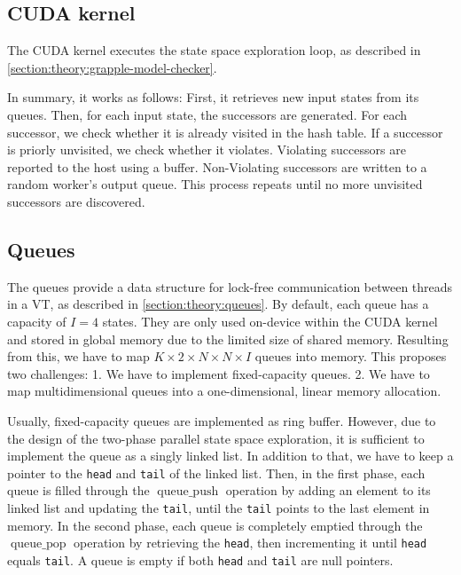 \documentclass[
fancyheadings, %
%
%
]{stsreprt}
\DeclareMathOperator{\qPop}{queue\_pop}
\DeclareMathOperator{\qPush}{queue\_push}
\begin{document}
\subsection{CUDA kernel}

The CUDA kernel executes the state space exploration loop, as described in \cref{section:theory:grapple-model-checker}.

In summary, it works as follows:
First, it retrieves new input states from its queues.
Then, for each input state, the successors are generated.
For each successor, we check whether it is already visited in the hash table.
If a successor is priorly unvisited, we check whether it violates.
Violating successors are reported to the host using a buffer.
Non-Violating successors are written to a random worker's output queue.
This process repeats until no more unvisited successors are discovered.


\subsection{Queues}

The queues provide a data structure for lock-free communication between threads in a VT, as described in \cref{section:theory:queues}.
By default, each queue has a capacity of $I=4$ states.
They are only used on-device within the CUDA kernel and stored in global memory due to the limited size of shared memory.
Resulting from this, we have to map $K \times 2 \times N \times N \times I$ queues into memory.
This proposes two challenges:
1. We have to implement fixed-capacity queues.
2. We have to map multidimensional queues into a one-dimensional, linear memory allocation.

Usually, fixed-capacity queues are implemented as ring buffer.
However, due to the design of the two-phase parallel state space exploration, it is sufficient to implement the queue as a singly linked list.
In addition to that, we have to keep a pointer to the \texttt{head} and \texttt{tail} of the linked list.
Then, in the first phase, each queue is filled through the $\qPush$ operation by adding an element to its linked list and updating the \texttt{tail}, until the \texttt{tail} points to the last element in memory.
In the second phase, each queue is completely emptied through the $\qPop$ operation by retrieving the \texttt{head}, then incrementing it until \texttt{head} equals \texttt{tail}.
A queue is empty if both \texttt{head} and \texttt{tail} are null pointers.
\end{document}
